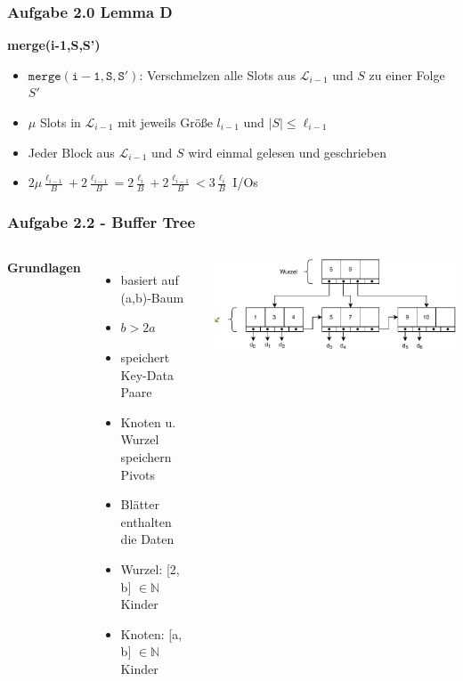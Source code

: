 \documentclass[aspectratio=169]{beamer}
\begin{document}
\begin{frame}
\frametitle{Aufgabe 2.0 Lemma D}

\textbf{merge(i-1,S,S')}
\begin{itemize}
	\item $\mathtt{merge(i-1,S,S')}$: Verschmelzen alle Slots aus $\mathcal{L}_{i-1}$ und $S$ zu einer Folge $S'$
	\item $\mu$ Slots in $\mathcal{L}_{i-1}$ mit jeweils Größe $l_{i-1}$ und $|S| \leq  \ell_{i-1}$
	\item Jeder Block aus $\mathcal{L}_{i-1}$ und $S$ wird einmal gelesen und geschrieben 
	\item $2\mu\frac{\ell_{i-1}}{B} + 2\frac{\ell_{i-1}}{B} = 2\frac{\ell_{i}}{B} + 2\frac{\ell_{i-1}}{B} < 3\frac{\ell_i}{B}$ I/Os
\end{itemize}

\end{frame}

\begin{frame}
\frametitle{Aufgabe 2.2 - Buffer Tree}
\begin{columns}[c] %
	
	\textbf{Grundlagen}
	\begin{itemize}
		\item basiert auf (a,b)-Baum
		\item $b > 2a$
		\item speichert Key-Data Paare
		
		\item Knoten u. Wurzel speichern Pivots
		\item Blätter enthalten die Daten
		\item Wurzel: [2, b] $\in \mathbb{N}$ Kinder
		\item Knoten: [a, b] $\in \mathbb{N}$ Kinder
		
		
	\end{itemize}
	
	\includegraphics[scale=.5]{bplus_overview.pdf}
	

	
\end{columns}
\end{frame}
\end{document}

